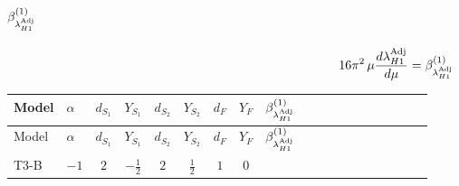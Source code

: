 \documentclass{article}
\begin{document}
\begin{landscape}
\begin{longtable}{@{}llcccccc >{\raggedright\arraybackslash}p{0.54\linewidth}@{}}
\midrule
\bottomrule
\end{longtable}
\clearpage
\section*{$\beta_{\lambda_{H1}^{\rm Adj}}^{(1)}$}
\[16\pi^2\,\mu\frac{d \lambda_{H1}^{\rm Adj}}{d\mu}=\beta_{\lambda_{H1}^{\rm Adj}}^{(1)}\]
\tiny
\begin{longtable}{@{}llcccccc >{\raggedright\arraybackslash}p{0.54\linewidth}@{}}
\toprule
Model & $\alpha$ & $d_{S_1}$ & $Y_{S_1}$ & $d_{S_2}$ & $Y_{S_2}$ & $d_F$ & $Y_F$ & $\beta_{\lambda_{H1}^{\rm Adj}}^{(1)}$ \\
\midrule
\endfirsthead
\toprule
Model & $\alpha$ & $d_{S_1}$ & $Y_{S_1}$ & $d_{S_2}$ & $Y_{S_2}$ & $d_F$ & $Y_F$ & $\beta_{\lambda_{H1}^{\rm Adj}}^{(1)}$ \\
\midrule
\endhead
T3-B & $-1$ & $2$ & $-\frac{1}{2}$ & $2$ & $\frac{1}{2}$ & $1$ & $0$ & \scriptsize\adjustbox{max width=\linewidth}{$\begin{gathered} {\lambda_{H1}^{\rm Adj}} (2 \operatorname{Tr}\!\left({y_1}\,\left({y_1}\right)^{\dagger}\right)+6 \operatorname{Tr}\!\left({Y_d}\,\left({Y_d}\right)^{\dagger}\right)+2 \operatorname{Tr}\!\left({Y_e}\,\left({Y_e}\right)^{\dagger}\right)+6 \operatorname{Tr}\!\left({Y_u}\,\left({Y_u}\right)^{\dagger}\right)) \\ +{\lambda_{H H^\dagger S_1^\dagger S_2^\dagger}^{\rm Cross}} \left(-\frac{2}{3} \operatorname{Tr}\!\left({y_1}\,\left({y_2}\right)^{\dagger}\right)-\frac{4}{3} (2 \left({\lambda_{H H^\dagger S_1^\dagger S_2^\dagger}^{\rm Cross}}\right)^{*}+\left({\lambda_{S_1 S_1^{\dagger 2}S_2^\dagger}}\right)^{*})\right) \\ -\frac{2}{3} \left({\lambda_{H H^\dagger S_1^\dagger S_2^\dagger}^{\rm Cross}}\right)^{*} \operatorname{Tr}\!\left({y_2}\,\left({y_1}\right)^{\dagger}\right) \\ +\frac{8}{3} \operatorname{Tr}\!\left({y_1}\,\left({y_1}\right)^{\dagger}\,{Y_e}\,\left({Y_e}\right)^{\dagger}\right) \\ +\frac{64}{3} {\lambda_{H^\dagger H^\dagger S_1^\dagger S_1^\dagger}} \left({\lambda_{H^\dagger H^\dagger S_1^\dagger S_1^\dagger}}\right)^{*} \\ -\frac{4}{3} {\lambda_{S_1 S_1^{\dagger 2}S_2^\dagger}} \left({\lambda_{H H^\dagger S_1^\dagger S_2^\dagger}^{\rm Cross}}\right)^{*} \\ +\frac{16}{3} {\lambda_{T3}} \left({\lambda_{T3}}\right)^{*} \\ +{g_Y}^2 \left(-6 {g_2}^2-3 {\lambda_{H1}^{\rm Adj}}\right) \\ -9 {g_2}^2 {\lambda_{H1}^{\rm Adj}} \\ +{\lambda_{12}^{\rm Adj}} {\lambda_{H2}^{\rm Adj}} \\ +2 {\lambda_H} {\lambda_{H1}^{\rm Adj}} \\ +8 {\lambda_{H1}} {\lambda_{H1}^{\rm Adj}} \\ +2 {\lambda_{H1}^{\rm Adj}} {\lambda_{S_1}}\end{gathered}$} \\

\end{longtable}
\end{landscape}
\end{document}
